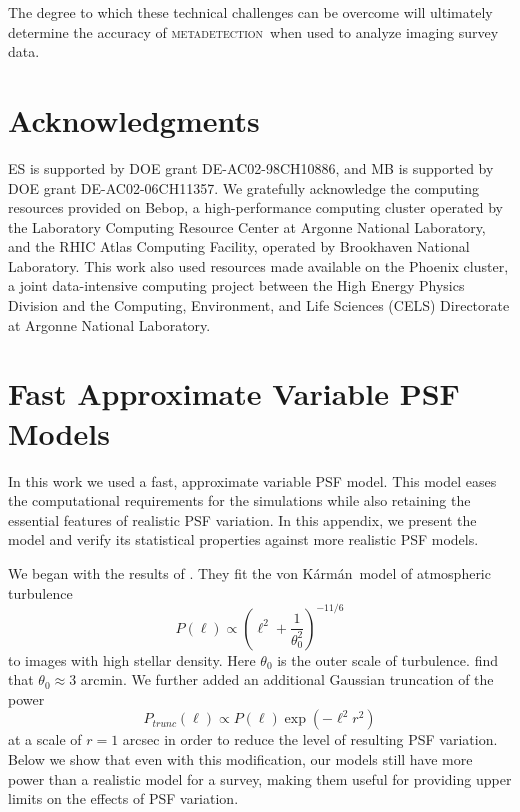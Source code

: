 \documentclass[iop, twocolappendix, appendixfloats, numberedappendix, apj]{hackemulateapj}
\newcommand{\mdet}{\textsc{metadetection}}
\newcommand{\vonkarman}{{von K\'arm\'an}~}
\begin{document}
The degree to which these technical challenges can be overcome will ultimately
determine the accuracy of \mdet\ when used to analyze imaging survey data.


\section*{Acknowledgments}

ES is supported by DOE grant DE-AC02-98CH10886, and MB is supported by DOE
grant DE-AC02-06CH11357.  We gratefully acknowledge the computing resources
provided on Bebop, a high-performance computing cluster operated by the
Laboratory Computing Resource Center at Argonne National Laboratory, and the
RHIC Atlas Computing Facility, operated by Brookhaven National Laboratory.
This work also used resources made available on the Phoenix cluster, a joint
data-intensive computing project between the High Energy Physics Division and
the Computing, Environment, and Life Sciences (CELS) Directorate at Argonne
National Laboratory.


%
%
%
%



\appendix

\section{Fast Approximate Variable PSF Models}\label{app:pspsf}

In this work we used a fast, approximate variable PSF model. This model eases the
computational requirements for the simulations while also retaining the
essential features of realistic PSF variation. In this appendix, we present
the model and verify its statistical properties against more realistic PSF models.

We began with the results of \citet{heymans2012}. They fit the \vonkarman model
of atmospheric turbulence
\begin{displaymath}
  P(\ell) \propto \left(\ell^{2} + \frac{1}{\theta_{0}^2}\right)^{-11/6}
\end{displaymath}
to images with high stellar density. Here $\theta_{0}$ is the outer scale of
turbulence. \citep{heymans2012} find that $\theta_{0}\approx3$ arcmin.
We further added an additional Gaussian truncation of the power
\begin{displaymath}
  P_{trunc}(\ell) \propto P(\ell)\exp\left(-\ell^2r^{2}\right)
\end{displaymath}
at a scale of $r=1$ arcsec in order to reduce the level of resulting
PSF variation. Below we show that even with this modification, our models
still have more power than a realistic model for a survey, making them useful
for providing upper limits on the effects of PSF variation.
\end{document}
